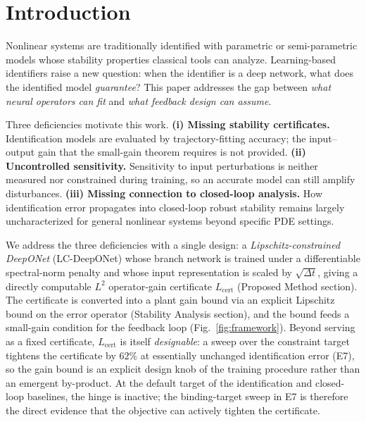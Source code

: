 \documentclass[11pt,sagev,times]{sagej}
\newcommand{\Ltwo}{L^2}
\newcommand{\Lhat}{L_{\mathrm{cert}}}
\begin{document}




\section{Introduction}\label{sec:intro}

Nonlinear systems are traditionally identified with parametric or
semi-parametric models whose stability properties classical tools can
analyze. Learning-based identifiers raise a new question: when the identifier
is a deep network, what does the identified model \emph{guarantee}? This paper
addresses the gap between \emph{what neural operators can fit} and \emph{what
feedback design can assume}.

Three deficiencies motivate this work.
\textbf{(i) Missing stability certificates.} Identification models are
evaluated by trajectory-fitting accuracy; the input--output gain that the
small-gain theorem requires is not provided.
\textbf{(ii) Uncontrolled sensitivity.} Sensitivity to input perturbations is
neither measured nor constrained during training, so an accurate model can
still amplify disturbances.
\textbf{(iii) Missing connection to closed-loop analysis.} How identification
error propagates into closed-loop robust stability remains largely
uncharacterized for general nonlinear systems beyond specific PDE settings.


We address the three deficiencies with a single design: a
\emph{Lipschitz-constrained DeepONet} (LC-DeepONet) whose branch network is
trained under a differentiable spectral-norm penalty and whose input
representation is scaled by
$\sqrt{\Delta t}$, giving a directly computable $\Ltwo$ operator-gain
certificate $\Lhat$ (Proposed Method section). The certificate is converted
into a plant gain bound via an explicit Lipschitz bound on the error operator
(Stability Analysis section), and the bound feeds a small-gain condition for the
feedback loop (Fig.~\ref{fig:framework}). Beyond serving as a fixed
certificate, $\Lhat$ is itself \emph{designable}: a sweep over the constraint
target tightens the certificate by $62\%$ at essentially unchanged
identification error (E7), so the gain bound is an explicit design knob of
the training procedure rather than an emergent by-product.
At the default target of the identification and closed-loop baselines,
the hinge is inactive; the binding-target sweep in E7 is therefore the direct
evidence that the objective can actively tighten the certificate.
\end{document}
